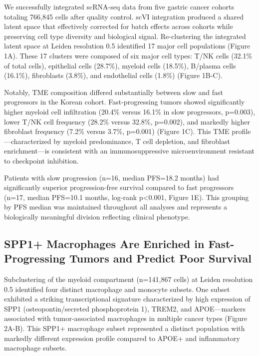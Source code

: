 \documentclass[12pt,twoside]{article}
\begin{document}
We successfully integrated scRNA-seq data from five gastric cancer cohorts totaling 766,845 cells after quality control. scVI integration produced a shared latent space that effectively corrected for batch effects across cohorts while preserving cell type diversity and biological signal. Re-clustering the integrated latent space at Leiden resolution 0.5 identified 17 major cell populations (Figure 1A). These 17 clusters were composed of six major cell types: T/NK cells (32.1\% of total cells), epithelial cells (28.7\%), myeloid cells (18.5\%), B/plasma cells (16.1\%), fibroblasts (3.8\%), and endothelial cells (1.8\%) (Figure 1B-C).

Notably, TME composition differed substantially between slow and fast progressors in the Korean cohort. Fast-progressing tumors showed significantly higher myeloid cell infiltration (20.4\% versus 16.1\% in slow progressors, p=0.003), lower T/NK cell frequency (28.2\% versus 32.8\%, p=0.002), and markedly higher fibroblast frequency (7.2\% versus 3.7\%, p=0.001) (Figure 1C). This TME profile—characterized by myeloid predominance, T cell depletion, and fibroblast enrichment—is consistent with an immunosuppressive microenvironment resistant to checkpoint inhibition.

Patients with slow progression (n=16, median PFS=18.2 months) had significantly superior progression-free survival compared to fast progressors (n=17, median PFS=10.1 months, log-rank p<0.001, Figure 1E). This grouping by PFS median was maintained throughout all analyses and represents a biologically meaningful division reflecting clinical phenotype.

\subsection{SPP1+ Macrophages Are Enriched in Fast-Progressing Tumors and Predict Poor Survival}

Subclustering of the myeloid compartment (n=141,867 cells) at Leiden resolution 0.5 identified four distinct macrophage and monocyte subsets. One subset exhibited a striking transcriptional signature characterized by high expression of SPP1 (osteopontin/secreted phosphoprotein 1), TREM2, and APOE—markers associated with tumor-associated macrophages in multiple cancer types (Figure 2A-B). This SPP1+ macrophage subset represented a distinct population with markedly different expression profile compared to APOE+ and inflammatory macrophage subsets.
\end{document}
